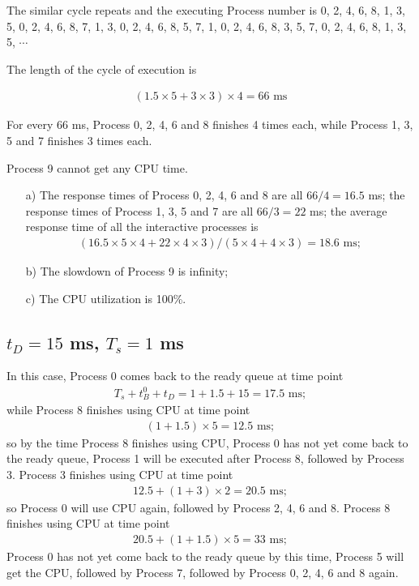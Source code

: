 \documentclass[12pt,letterpaper]{article}
\begin{document}
The similar cycle repeats and the executing Process number is 0, 2, 4, 6, 8, 1, 3, 5, 0, 2, 4, 6, 8, 7, 1, 3, 0, 2, 4, 6, 8, 5, 7, 1, 0, 2, 4, 6, 8, 3, 5, 7, 0, 2, 4, 6, 8, 1, 3, 5, $\cdots$

The length of the cycle of execution is 

\begin{eqnarray}
(1.5\times5+3\times3)\times4=66\textrm{ ms}
\end{eqnarray}

For every 66 ms, Process 0, 2, 4, 6 and 8 finishes 4 times each, while Process 1, 3, 5 and 7 finishes 3 times each.

Process 9 cannot get any CPU time.

\begin{enumerate}
\item[a)] The response times of Process 0, 2, 4, 6 and 8 are all $66/4=16.5$ ms;
the response times of Process 1, 3, 5 and 7 are all $66/3=22$ ms;
the average response time of all the interactive processes is 
\begin{eqnarray}
(16.5\times5\times4+22\times4\times3)/(5\times4+4\times3)=18.6\textrm{ ms};
\end{eqnarray}
\item[b)] The slowdown of Process 9 is infinity;
\item[c)] The CPU utilization is 100\%.
\end{enumerate}

\subsection{$t_D=15$ ms, $T_s = 1$ ms}
In this case, Process 0 comes back to the ready queue at time point
\begin{eqnarray}
T_s+t_B^0+t_D=1+1.5+15=17.5\textrm{ ms};
\end{eqnarray}
while Process 8 finishes using CPU at time point 
\begin{eqnarray}
(1+1.5)\times5=12.5\textrm{ ms};
\end{eqnarray}
so by the time Process 8 finishes using CPU, Process 0 has not yet come back to the ready queue, Process 1 will be executed after Process 8, followed by Process 3. Process 3 finishes using CPU at time point
\begin{eqnarray}
12.5+(1+3)\times2=20.5\textrm{ ms};
\end{eqnarray}
so Process 0 will use CPU again, followed by Process 2, 4, 6 and 8. Process 8 finishes using CPU at time point
\begin{eqnarray}
20.5+(1+1.5)\times5=33\textrm{ ms};
\end{eqnarray}
Process 0 has not yet come back to the ready queue by this time, Process 5 will get the CPU, followed by Process 7, followed by Process 0, 2, 4, 6 and 8 again.
\end{document}
